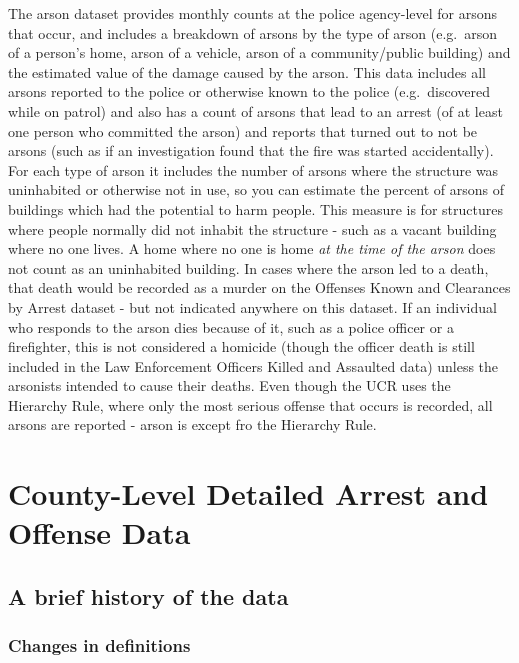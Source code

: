 \documentclass[
  12pt,
  openany]{book}
\begin{document}
The arson dataset provides monthly counts at the police agency-level for arsons that occur, and includes a breakdown of arsons by the type of arson (e.g.~arson of a person's home, arson of a vehicle, arson of a community/public building) and the estimated value of the damage caused by the arson. This data includes all arsons reported to the police or otherwise known to the police (e.g.~discovered while on patrol) and also has a count of arsons that lead to an arrest (of at least one person who committed the arson) and reports that turned out to not be arsons (such as if an investigation found that the fire was started accidentally). For each type of arson it includes the number of arsons where the structure was uninhabited or otherwise not in use, so you can estimate the percent of arsons of buildings which had the potential to harm people. This measure is for structures where people normally did not inhabit the structure - such as a vacant building where no one lives. A home where no one is home \emph{at the time of the arson} does not count as an uninhabited building. In cases where the arson led to a death, that death would be recorded as a murder on the Offenses Known and Clearances by Arrest dataset - but not indicated anywhere on this dataset. If an individual who responds to the arson dies because of it, such as a police officer or a firefighter, this is not considered a homicide (though the officer death is still included in the Law Enforcement Officers Killed and Assaulted data) unless the arsonists intended to cause their deaths. Even though the UCR uses the Hierarchy Rule, where only the most serious offense that occurs is recorded, all arsons are reported - arson is except fro the Hierarchy Rule.

\hypertarget{county_level}{%
\chapter{County-Level Detailed Arrest and Offense Data}\label{county_level}}

\hypertarget{a-brief-history-of-the-data-6}{%
\section{A brief history of the data}\label{a-brief-history-of-the-data-6}}

\hypertarget{changes-in-definitions-6}{%
\subsection{Changes in definitions}\label{changes-in-definitions-6}}
\end{document}
